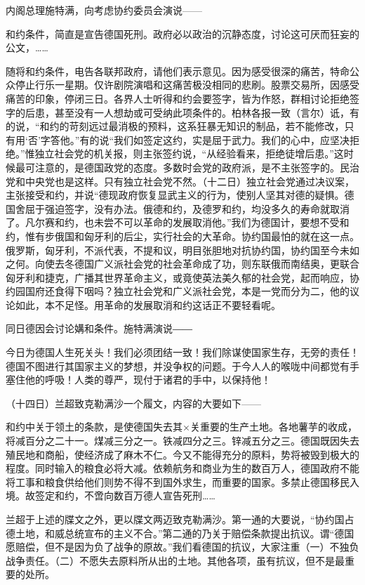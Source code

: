 内阁总理施特满，向考虑协约委员会演说——

和约条件，简直是宣告德国死刑。政府必以政治的沉静态度，讨论这可厌而狂妄的公文，……

随将和约条件，电告各联邦政府，请他们表示意见。因为感受很深的痛苦，特命公众停止行乐一星期。仅许剧院演唱和这痛苦极没相同的悲刷。股票交易所，因感受痛苦的印象，停闭三日。各界人士听得和约会要签字，皆为作怒，群相讨论拒绝签字的后患，甚至没有一人想劫或可受纳此项条件的。柏林各报一致（言尔）诋，有的说，“和约的苛刻远过最消极的预料，这系狂暴无知识的制品，若不能修改，只有用‘否’字答他。”有的说“我们如签定这约，实是屈于武力。我们的心中，应坚决拒绝。”惟独立社会党的机关报，则主张签约说，“从经验看来，拒绝徒增后患。”这时候最可注意的，是德国政党的态度。多数时会党的政府派，是不主张签字的。民治党和中央党也是这样。只有独立社会党不然。（十二日）独立社会党通过决议案，主张接受和约，并说“德现政府恢复显武主义的行为，使别人坚其对德的疑惧。德国舍屈于强迫签字，没有办法。俄德和约，及德罗和约，均没多久的寿命就取消了。凡尔赛和约，也未尝不可以革命的发展取消他。”我们为德国计，要想不受和约，惟有步俄国和匈牙利的后尘，实行社会的大革命。协约国最怕的就在这一点。俄罗斯，匈牙利，不派代表，不提和议，明目张胆地对抗协约国，协约国至今未如之何。向使去冬德国广义派社会党的社会革命成了功，则东联俄而南结奥，更联合匈牙利和捷克，广播其世界革命主义，或竟使英法美久郁的社会党，起而响应，协约园国府还食得下咽吗？独立社会党和广义派社会党，本是一党而分为二，他的议论如此，本不足怪。用革命的发展取消和约这话正不要轻看呢。

同日德因会讨论媾和条件。施特满演说――

今日为德国人生死关头！我们必须团结一致！我们除谋使国家生存，无旁的责任！德国不图进行其国家主义的梦想，并没争权的问题。于今人人的喉咙中间都觉有手塞住他的呼吸！人类的尊严，现付于诸君的手中，以保持他！

（十四日）兰超致克勒满沙一个履文，内容的大要如下——

和约中关于领土的条款，是使德国失去其×关重要的生产土地。各地薯芋的收成，将减百分之二十一。煤减三分之一。铁减四分之三。锌减五分之三。德国既因失去殖民地和商船，使经济成了麻木不仁。今又不能得充分的原料，势将被毁到极大的程度。同时输入的粮食必将大减。依赖航务和商业为生的数百万人，德国政府不能将工事和粮食供给他们则势不得不到国外求生，而重要的国家。多禁止德国移民入境。故签定和约，不啻向数百万德人宣告死刑……

兰超于上述的牒文之外，更以牒文两迈致克勒满沙。第一通的大要说，“协约国占德土地，和威总统宣布的主义不合。”第二通的乃关于赔偿条款提出抗议。谓“德国愿赔偿，但不是因为负了战争的原故。”我们看德国的抗议，大家注重（一）不独负战争责任。（二）不愿失去原料所从出的土地。其他各项，虽有抗议，但不是最重要的处所。

